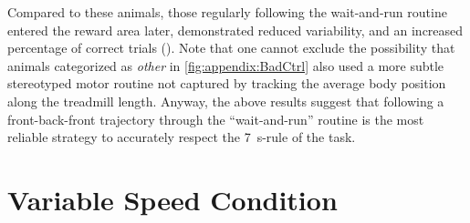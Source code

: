 Compared to these animals, those regularly following the wait-and-run routine entered the reward area later, demonstrated reduced variability, and an increased percentage of correct trials ().
Note that one cannot exclude the possibility that animals categorized as \textit{other} in \autoref{fig:appendix:BadCtrl} also used a more subtle stereotyped motor routine not captured by tracking the average body position along the treadmill length.
Anyway, the above results suggest that following a front-back-front trajectory through the ``wait-and-run'' routine is the most reliable strategy to accurately respect the 7~s-rule of the task.


\section{Variable Speed Condition}
\label{ch:time:varSpeed}

